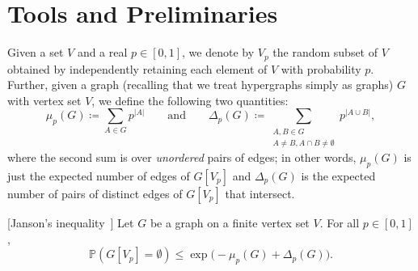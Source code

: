 \documentclass[11pt,a4paper,oneside,reqno]{amsart}
\renewcommand{\Pr}{\mathbb{P}}
\newcommand{\1}{\mathbbm{1}} %
\renewcommand{\le}{\leqslant}
\begin{document}

\section{Tools and Preliminaries}\label{section:prel}

Given a set $V$ and a real $p \in [0,1]$, we denote by $V_p$ the random subset of $V$ obtained by independently retaining each element of $V$ with probability $p$.  Further, given a graph (recalling that we treat hypergraphs simply as graphs) $G$ with vertex set $V$, we define the following two quantities:
\[
  \mu_p(G) \coloneqq \sum_{A \in G} p^{|A|}
  \qquad
  \text{and}
  \qquad
  \Delta_p(G) \coloneqq \sum_{\substack{A, B \in G \\ A \neq B, A \cap B \neq \emptyset}} p^{|A \cup B|},
\]
where the second sum is over \emph{unordered} pairs of edges;  in other words, $\mu_p(G)$ is just the expected number of edges of $G[V_p]$ and $\Delta_p(G)$ is the expected number of pairs of distinct edges of $G[V_p]$ that intersect.

\begin{thm}\label{theorem:Janson}[{Janson's inequality~\cite{Jan90}}]
  Let $G$ be a graph on a finite vertex set $V$.  For all $p \in [0,1]$,
  \[
    \Pr(G[V_p] = \emptyset) \le \exp\big(-\mu_p(G)+\Delta_p(G)\big).
  \]
\end{thm}
\end{document}
